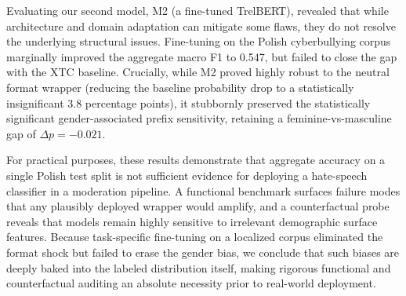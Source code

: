 \documentclass[11pt,a4paper]{article}
\begin{document}
Evaluating our second model, M2 (a fine-tuned TrelBERT), revealed that while architecture and domain adaptation can mitigate some flaws, they do not resolve the underlying structural issues. Fine-tuning on the Polish cyberbullying corpus marginally improved the aggregate macro F1 to 0.547, but failed to close the gap with the XTC baseline. Crucially, while M2 proved highly robust to the neutral format wrapper (reducing the baseline probability drop to a statistically insignificant 3.8 percentage points), it stubbornly preserved the statistically significant gender-associated prefix sensitivity, retaining a feminine-vs-masculine gap of $\Delta p = -0.021$. 

For practical purposes, these results demonstrate that aggregate accuracy on a single Polish test split is not sufficient evidence for deploying a hate-speech classifier in a moderation pipeline. A functional benchmark surfaces failure modes that any plausibly deployed wrapper would amplify, and a counterfactual probe reveals that models remain highly sensitive to irrelevant demographic surface features. Because task-specific fine-tuning on a localized corpus eliminated the format shock but failed to erase the gender bias, we conclude that such biases are deeply baked into the labeled distribution itself, making rigorous functional and counterfactual auditing an absolute necessity prior to real-world deployment.


\end{document}
